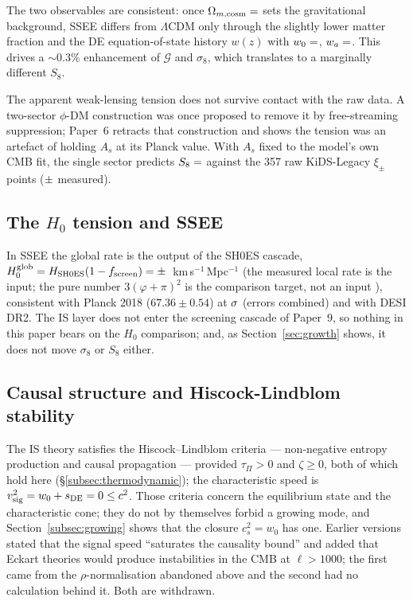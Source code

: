 \documentclass[12pt,a4paper]{article}
\newcommand{\wz}{w_0}
\newcommand{\sDE}{s_{\mathrm{DE}}}
\newcommand{\tauPi}{\tau_\Pi}
\begin{document}
The two observables are consistent: once $\Omega_{m,\mathrm{cosm}}=\val{OMEGA_M_TOTAL_d6}$
sets the gravitational background, SSEE differs from $\Lambda$CDM only
through the slightly lower matter fraction and the DE equation-of-state history
$w(z)$ with $w_0=\val{W0_d6}$, $w_a=\val{WA_d6}$.
This drives a $\sim$0.3\% enhancement of $\mathcal{G}$ and $\sigma_8$, which
translates to a marginally different $S_8$.

The apparent weak-lensing tension does not survive contact with the raw data.
A two-sector $\phi$-DM construction was once proposed to remove it by
free-streaming suppression; Paper~6 retracts that construction and shows the
tension was an artefact of holding $A_s$ at its Planck value. With $A_s$ fixed
to the model's own CMB fit, the single sector predicts $S_8 = \val{S8_leg_pred}$ against
the 357 raw KiDS-Legacy $\xi_\pm$ points ($\val{S8_legacy_dato}\pm\val{S8_legacy_dato_sigma}$ measured).

\subsection{The $H_0$ tension and SSEE}
\label{subsec:H0}

In SSEE the global rate is the output of the SH0ES cascade,
$H_0^{\rm glob}=H_{\rm SH0ES}(1-f_{\rm screen})=\val{H0_GLOBAL_d3}\pm\val{p9_hglob_sigma}$~km\,s$^{-1}$\,Mpc$^{-1}$
(the measured local rate is the input; the pure number $3(\varphi+\pi)^2$ is the
comparison target, not an input \citep{SSEE_Paper4}), consistent with Planck 2018
($67.36 \pm 0.54$) at $\val{hglob_planck_sig}\sigma$ (errors combined) and with DESI DR2.
The IS layer does not enter the screening cascade of Paper~9, so nothing in this
paper bears on the $H_0$ comparison; and, as Section~\ref{sec:growth} shows, it
does not move $\sigma_8$ or $S_8$ either.

\subsection{Causal structure and Hiscock-Lindblom stability}
\label{subsec:HL}

The IS theory satisfies the Hiscock--Lindblom criteria \citep{HiscockLindblom1983}
--- non-negative entropy production and causal propagation --- provided
$\tauPi > 0$ and $\zeta \geq 0$, both of which hold here
(\S\ref{subsec:thermodynamic}); the characteristic speed is
$v^2_{\rm sig}=\wz+\sDE=0\leq c^2$. Those criteria concern the equilibrium state and
the characteristic cone; they do not by themselves forbid a growing mode, and
Section~\ref{subsec:growing} shows that the closure $c^2_s=\wz$ has one. Earlier
versions stated that the signal speed ``saturates the causality bound'' and added
that Eckart theories would produce instabilities in the CMB at $\ell>1000$; the
first came from the $\rho$-normalisation abandoned above and the second had no
calculation behind it. Both are withdrawn.
\end{document}
